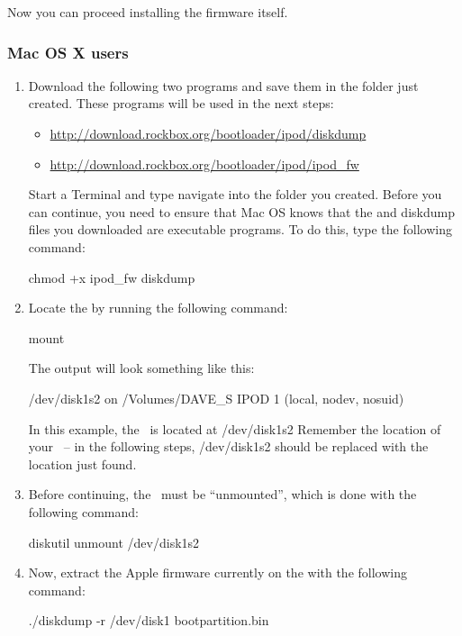 Now you can proceed installing the firmware itself.

\subsubsection{Mac OS X users}
\begin{enumerate}
  \item Download the following two programs and save them in the folder just
    created. These programs will be used in the next steps:
    \begin{itemize}
      \item \url{http://download.rockbox.org/bootloader/ipod/diskdump}
      \item \url{http://download.rockbox.org/bootloader/ipod/ipod_fw}
    \end{itemize}
    Start a Terminal and type navigate into the folder you created. Before
    you can continue, you need to ensure that Mac OS knows that the
    and diskdump files you downloaded are executable programs. To do this,
    type the following command:
    \begin{code}
    chmod +x ipod_fw diskdump
    \end{code}
  \item Locate the \dap{} by running the following command:
    \begin{code}
    mount
    \end{code}
    The output will look something like this: 
    \begin{code}
    /dev/disk1s2 on /Volumes/DAVE_S IPOD 1 (local, nodev, nosuid)
    \end{code}
    In this example, the \dap\ is located at /dev/disk1s2 Remember the 
    location of your \dap\  -- in the following steps, /dev/disk1s2 should be
    replaced with the location just found.
  \item Before continuing, the \dap\ must be ``unmounted'', which is
    done with the following command:
    \begin{code}
    diskutil unmount /dev/disk1s2
    \end{code}
  \item Now, extract the Apple firmware currently on the \dap{} with the
    following command:
    \begin{code}
    ./diskdump -r /dev/disk1 bootpartition.bin
    \end{code}
\end{enumerate}
